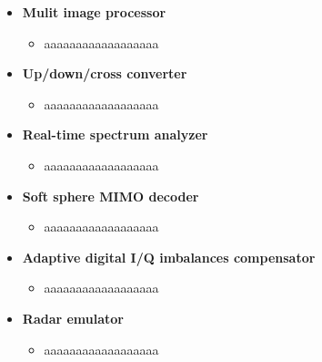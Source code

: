 
\begin{itemize}
	\item \textbf{Mulit image processor}
	      \begin{itemize}
		      \item aaaaaaaaaaaaaaaaaa
	      \end{itemize}
	\item \textbf{Up/down/cross converter}
	      \begin{itemize}
		      \item aaaaaaaaaaaaaaaaaa
	      \end{itemize}
	\item \textbf{Real-time spectrum analyzer}
	      \begin{itemize}
		      \item aaaaaaaaaaaaaaaaaa
	      \end{itemize}
	\item \textbf{Soft sphere MIMO decoder}
	      \begin{itemize}
		      \item aaaaaaaaaaaaaaaaaa
	      \end{itemize}
	\item \textbf{Adaptive digital I/Q imbalances compensator}
	      \begin{itemize}
		      \item aaaaaaaaaaaaaaaaaa
	      \end{itemize}
	\item \textbf{Radar emulator}
	      \begin{itemize}
		      \item aaaaaaaaaaaaaaaaaa
	      \end{itemize}
\end{itemize}